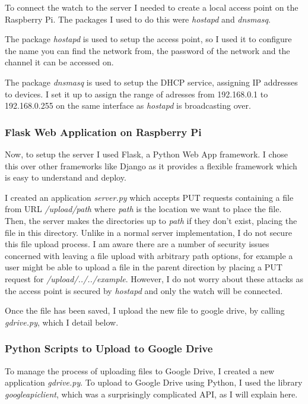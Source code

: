 \documentclass[12pt,a4paper,twoside,openright]{report}
\begin{document}
To connect the watch to the server I needed to create a local access point on the
Raspberry Pi. The
packages I used to do this were \emph{hostapd} and \emph{dnsmasq}. 

The package \emph{hostapd} is used to setup the access point, so I used it to configure
the name you can find the network from, the password of the network and the
channel it can be accessed on. 

The package \emph{dnsmasq} is used to setup the DHCP service, assigning IP
addresses to devices. I set it up to assign the range of adresses from 192.168.0.1 to
192.168.0.255 on the same interface as \emph{hostapd} is broadcasting over.

\subsubsection{Flask Web Application on Raspberry Pi}

Now, to setup the server I used Flask, a Python Web App framework. I chose
this over other frameworks like Django as it provides a flexible framework
which is easy to understand and deploy.

I created an application \emph{server.py} which
accepts PUT requests containing a file from URL \emph{/upload/path} where
\emph{path} is the location we want to place the file. Then, the server
makes the directories up to \emph{path} if they don't exist, placing the file
in this directory. Unlike in a normal server implementation, I do not secure
this file upload process. I am aware there are a number of security issues
concerned with leaving a file upload with arbitrary path options, for example
a user might be able to upload a file in the parent direction by placing a PUT
request for \emph{/upload/../../example}. However, I do not worry about these
attacks as the access point is secured by \emph{hostapd} and only the watch
will be connected.

Once the file has been saved, I upload the new file to google drive, by
calling \emph{gdrive.py}, which I detail below.

\subsubsection{Python Scripts to Upload to Google Drive}

To manage the process of uploading files to Google Drive, I created a new
application \emph{gdrive.py}. To upload to Google Drive using Python, I used
the library \emph{googleapiclient}, which was a surprisingly complicated API,
as I will explain here.
\end{document}
